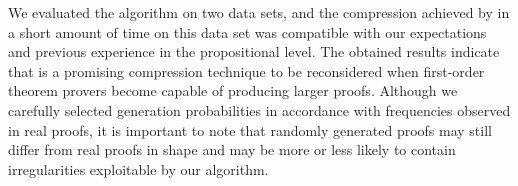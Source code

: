 We evaluated the algorithm on two data sets, and
the compression achieved by {\FORPI} in a short amount of time on this data set was compatible with our expectations and previous experience in the propositional level. 
The obtained results indicate that {\FORPI} is a promising compression technique to be reconsidered when first-order theorem provers become capable of producing larger proofs. Although we carefully selected generation probabilities in accordance with frequencies observed in real proofs, it is important to note that randomly generated proofs may still differ from real proofs in shape and may be more or less likely to contain irregularities exploitable by our algorithm. 

